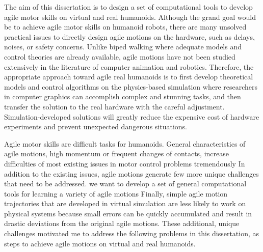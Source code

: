 The aim of this dissertation is to design a set of computational tools to
develop agile motor skills on virtual and real humanoids.
Although the grand goal would be to achieve agile motor skills on humanoid
robots,  there are many unsolved practical issues to directly
design agile 
motions on the hardware, such as delays, noises, or safety concerns.
Unlike biped walking where adequate models and control theories are
already available, agile motions have not been studied extensively in the
literature of computer animation and robotics.
Therefore, the appropriate approach toward agile real humanoids is to first
develop theoretical models and control algorithms on the physics-based
simulation where researchers in computer graphics can accomplish complex and
stunning tasks, and then transfer the solution to the real hardware
with the careful adjustment.
Simulation-developed solutions will
greatly reduce the expensive cost of hardware experiments and prevent
unexpected dangerous situations.

Agile motor skills are difficult tasks for humanoids.
General characteristics of agile motions, high momentum or frequent changes
of contacts, increase difficulties of most existing issues in motor control
problems tremendously
In addition to the existing issues, agile motions generate few more unique
challenges that need to be addressed. 
we want to develop a set of general computational tools for learning a variety
of agile motions  
Finally, simple agile motion trajectories that are developed in virtual
simulation are less likely to work on physical systems
because small errors can be quickly accumulated and result in drastic deviations
from the original agile motions.
These additional, unique challenges motivated me to address the following 
problems in this dissertation, as steps to achieve agile motions 
on virtual and real humanoids.

